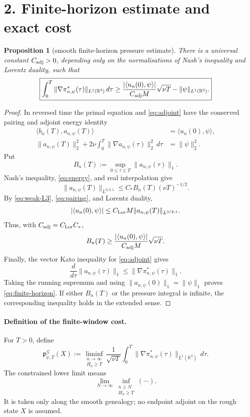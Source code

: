 \documentclass[11pt]{article}
\newcommand{\R}{\mathbb R}
\newcommand{\cG}{\mathcal G}
\newcommand{\LorentzDual}{L^{3/2,1}}
\newtheorem{proposition}{Proposition}
\begin{document}
\section*{2. Finite-horizon estimate and exact cost}

\begin{proposition}[smooth finite-horizon pressure estimate]
\label{prop:finite-horizon}
There is a universal constant \(C_{\rm adj}>0\), depending only on the
normalisations of Nash's inequality and Lorentz duality, such that
\begin{equation}
  \boxed{
  \int_0^T
  \|\nabla\pi^*_{n,\psi}(\tau)\|_{L^1(\R^3)}\,d\tau
  \ge
  \frac{|\langle u_n(0),\psi\rangle|}
       {C_{\rm adj}M}\sqrt{\nu T}
  -\|\psi\|_{L^1(\R^3)} .}
  \label{eq:finite-horizon}
\end{equation}
\end{proposition}

\begin{proof}
In reversed time the primal equation and \eqref{eq:adjoint} have the
conserved pairing and adjoint energy identity
\begin{align}
  \langle b_n(T),a_{n,\psi}(T)\rangle
    &=\langle u_n(0),\psi\rangle,
    \label{eq:pairing}\\
  \|a_{n,\psi}(T)\|_2^2
  +2\nu\int_0^T\|\nabla a_{n,\psi}(\tau)\|_2^2\,d\tau
    &=\|\psi\|_2^2.
    \label{eq:energy}
\end{align}
Put
\[
  B_n(T):=\sup_{0\le\tau\le T}\|a_{n,\psi}(\tau)\|_1.
\]
Nash's inequality, \eqref{eq:energy}, and real interpolation give
\[
  \|a_{n,\psi}(T)\|_{\LorentzDual}
  \le C_* B_n(T)(\nu T)^{-1/2}.
\]
By \eqref{eq:weak-L3}, \eqref{eq:pairing}, and Lorentz duality,
\[
  |\langle u_n(0),\psi\rangle|
  \le C_{\rm Lor}M
      \|a_{n,\psi}(T)\|_{\LorentzDual}.
\]
Thus, with \(C_{\rm adj}=C_{\rm Lor}C_*\),
\[
  B_n(T)
  \ge
  \frac{|\langle u_n(0),\psi\rangle|}
       {C_{\rm adj}M}\sqrt{\nu T}.
\]
Finally, the vector Kato inequality for \eqref{eq:adjoint} gives
\[
  \frac{d}{d\tau}\|a_{n,\psi}(\tau)\|_1
  \le\|\nabla\pi^*_{n,\psi}(\tau)\|_1.
\]
Taking the running supremum and using
\(\|a_{n,\psi}(0)\|_1=\|\psi\|_1\) proves
\eqref{eq:finite-horizon}.  If either \(B_n(T)\) or the pressure integral
is infinite, the corresponding inequality holds in the extended sense.
\end{proof}

\paragraph{Definition of the finite-window cost.}
For \(T>0\), define
\begin{equation}
  \boxed{
  \mathfrak p^\cG_{\psi,T}(X)
  :=
  \liminf_{\substack{n\to\infty\\H_n\ge T}}
  \frac{1}{\sqrt{\nu T}}
  \int_0^T
  \|\nabla\pi^*_{n,\psi}(\tau)\|_{L^1(\R^3)}\,d\tau .}
  \label{eq:cost}
\end{equation}
The constrained lower limit means
\[
  \lim_{N\to\infty}
  \inf_{\substack{n\ge N\\H_n\ge T}}(\cdots).
\]
It is taken only along the smooth genealogy; no endpoint adjoint on the
rough state \(X\) is assumed.
\end{document}
